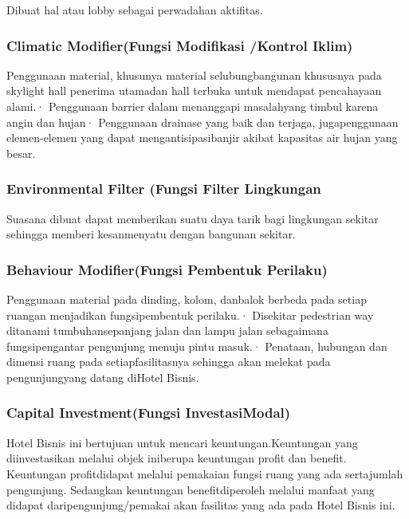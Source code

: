 \documentclass[../manperil.tex]{subfiles}
\begin{document}
Dibuat hal atau lobby sebagai perwadahan aktifitas.

\subsubsection{Climatic Modifier(Fungsi Modifikasi /Kontrol Iklim)}%
\label{ssub:climatic_modifier(fungsi_modifikasi_/kontrol_iklim)}

Penggunaan material, khusunya material selubungbangunan khususnya pada skylight hall penerima utamadan hall terbuka untuk mendapat pencahayaan alami.· Penggunaan barrier dalam menanggapi masalahyang timbul karena angin dan hujan· Penggunaan drainase yang baik dan terjaga, jugapenggunaan elemen-elemen yang dapat mengantisipasibanjir akibat kapasitas air hujan yang besar.

\subsubsection{Environmental Filter (Fungsi Filter Lingkungan}%
\label{sub:Environmental Filter (Fungsi Filter Lingkungan}

Suasana dibuat dapat memberikan suatu daya tarik bagi lingkungan sekitar sehingga memberi kesanmenyatu dengan bangunan sekitar.

\subsubsection{Behaviour Modifier(Fungsi Pembentuk Perilaku)}%
\label{sub:behaviour_modifier(fungsi_pembentuk_perilaku)}

Penggunaan material pada dinding, kolom, danbalok berbeda pada setiap ruangan menjadikan fungsipembentuk perilaku.· Disekitar pedestrian way ditanami tumbuhansepanjang jalan dan lampu jalan sebagaimana fungsipengantar pengunjung menuju pintu masuk.· Penataan, hubungan dan dimensi ruang pada setiapfasilitasnya sehingga akan melekat pada pengunjungyang datang diHotel Bisnis.

\subsubsection{Capital Investment(Fungsi InvestasiModal)}%
\label{sub:capital_investment(fungsi_investasimodal)}
Hotel Bisnis ini bertujuan untuk mencari keuntungan.Keuntungan yang diinvestasikan melalui objek iniberupa keuntungan profit dan benefit. Keuntungan profitdidapat melalui pemakaian fungsi ruang yang ada sertajumlah pengunjung. Sedangkan keuntungan benefitdiperoleh melalui manfaat yang didapat daripengunjung/pemakai akan fasilitas yang ada pada Hotel Bisnis ini.
\end{document}
